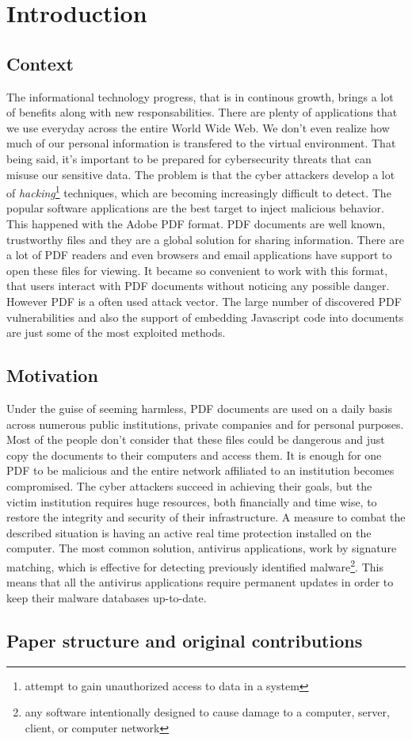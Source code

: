 \chapter{Introduction}
\label{chapter:introduction}

\section{Context}
\label{section:context} 
The informational technology progress, that is in continous growth, brings a lot of benefits along with new responsabilities. There are plenty of applications that we use everyday across the entire World Wide Web. We don't even realize how much of our personal information is transfered to the virtual environment. That being said, it's important to be prepared for cybersecurity threats that can misuse our sensitive data. The problem is that the cyber attackers develop a lot of \textit{hacking}\footnote{attempt to gain unauthorized access to data in a system} techniques, which are becoming increasingly difficult to detect. The popular software applications are the best target to inject malicious behavior. This happened with the Adobe PDF format. PDF documents are well known, trustworthy files and they are a global solution for sharing information. There are a lot of PDF readers and even browsers and email applications have support to open these files for viewing. It became so convenient to work with this format, that users interact with PDF documents without noticing any possible danger. However PDF is a often used attack vector. The large number of discovered PDF vulnerabilities and also the support of embedding Javascript code into documents are just some of the most exploited methods.


\section{Motivation}
\label{section:motivation}
Under the guise of seeming harmless, PDF documents are used on a daily basis across numerous public institutions, private companies and for personal purposes. Most of the people don't consider that these files could be dangerous and just copy the documents to their computers and access them. It is enough for one PDF to be malicious and the entire network affiliated to an institution becomes compromised. The cyber attackers succeed in achieving their goals, but the victim institution requires huge resources, both financially and time wise, to restore the integrity and security of their infrastructure. A measure to combat the described situation is having an active real time protection installed on the computer. The most common solution, antivirus applications, work by signature matching, which is effective for detecting previously identified malware\footnote{any software intentionally designed to cause damage to a computer, server, client, or computer network}. This means that all the antivirus applications require permanent updates in order to keep their malware databases up-to-date.




\section{Paper structure and original contributions}
\label{section:structure}

